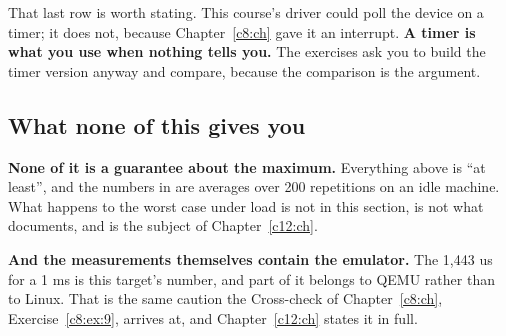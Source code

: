 \noindent That last row is worth stating. This course's driver could poll the device on a timer; it
does not, because Chapter~\ref{c8:ch} gave it an interrupt. \textbf{A timer is what you use when
nothing tells you.} The exercises ask you to build the timer version anyway and compare, because the
comparison is the argument.

\subsection{What none of this gives you}
\label{c9:app:b6}

\textbf{None of it is a guarantee about the maximum.} Everything above is ``at least'', and the
numbers in  are averages over 200 repetitions on an idle machine. What happens to
the worst case under load is not in this section, is not what  documents, and is the
subject of Chapter~\ref{c12:ch}.

\textbf{And the measurements themselves contain the emulator.} The 1,443 us for a 1 ms
 is this target's number, and part of it belongs to QEMU rather than to Linux.
That is the same caution the Cross-check of Chapter~\ref{c8:ch}, Exercise~\ref{c8:ex:9}, arrives at,
and Chapter~\ref{c12:ch} states it in full.
